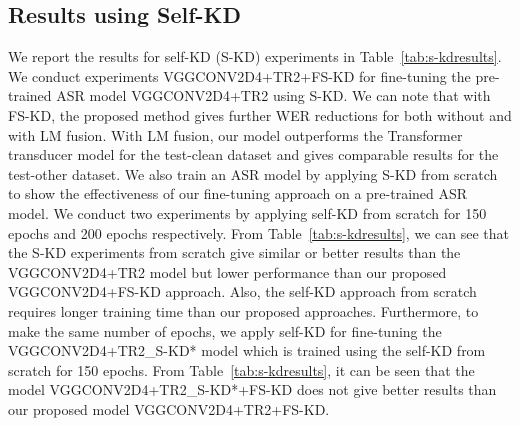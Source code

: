 \documentclass{article}
\begin{document}
\subsection{Results using Self-KD}
We report the results for self-KD (S-KD) experiments in Table~\ref{tab:s-kdresults}. We conduct experiments VGGCONV2D4+TR2+FS-KD for fine-tuning the pre-trained ASR model VGGCONV2D4+TR2 using S-KD. We can note that with FS-KD, the proposed method gives further WER reductions for both without and with LM fusion. With LM fusion, our model outperforms the Transformer transducer model for the test-clean dataset and gives comparable results for the test-other dataset. We also train an ASR model by applying S-KD from scratch to show the effectiveness of our fine-tuning approach on a pre-trained ASR model. We conduct two experiments by applying self-KD from scratch for 150 epochs and 200 epochs respectively. From Table~\ref{tab:s-kdresults}, we can see that the S-KD experiments from scratch give similar or better results than the VGGCONV2D4+TR2 model but lower performance than our proposed VGGCONV2D4+FS-KD approach. Also, the self-KD approach from scratch requires longer training time than our proposed approaches. Furthermore, to make the same number of epochs, we apply self-KD for fine-tuning the VGGCONV2D4+TR2\_S-KD* model which is trained using the self-KD from scratch for 150 epochs. From Table~\ref{tab:s-kdresults}, it can be seen that the model VGGCONV2D4+TR2\_S-KD*+FS-KD  does not give better results than our proposed model VGGCONV2D4+TR2+FS-KD.            






 
\end{document}
